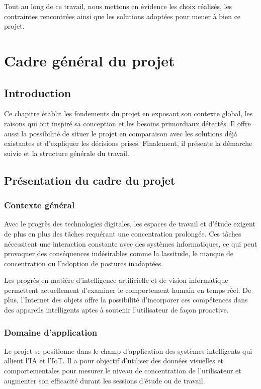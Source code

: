 \documentclass[12pt,a4paper]{report}
\begin{document}
Tout au long de ce travail, nous mettons en évidence les choix réalisés, les contraintes rencontrées ainsi que les solutions adoptées pour mener à bien ce projet.

\clearpage

\chapter{Cadre général du projet}

\section{Introduction}
Ce chapitre établit les fondements du projet en exposant son contexte global, les raisons qui ont inspiré sa conception et les besoins primordiaux détectés. Il offre aussi la possibilité de situer le projet en comparaison avec les solutions déjà existantes et d'expliquer les décisions prises. Finalement, il présente la démarche suivie et la structure générale du travail.

\section{Présentation du cadre du projet}

\subsection{Contexte général}
Avec le progrès des technologies digitales, les espaces de travail et d'étude exigent de plus en plus des tâches requérant une concentration prolongée. Ces tâches nécessitent une interaction constante avec des systèmes informatiques, ce qui peut provoquer des conséquences indésirables comme la lassitude, le manque de concentration ou l'adoption de postures inadaptées.

Les progrès en matière d'intelligence artificielle et de vision informatique permettent actuellement d'examiner le comportement humain en temps réel. De plus, l'Internet des objets offre la possibilité d'incorporer ces compétences dans des appareils intelligents aptes à soutenir l'utilisateur de façon proactive.

\subsection{Domaine d'application}
Le projet se positionne dans le champ d'application des systèmes intelligents qui allient l'\ac{IA} et l'\ac{IoT}. Il a pour objectif d'utiliser des données visuelles et comportementales pour mesurer le niveau de concentration de l'utilisateur et augmenter son efficacité durant les sessions d'étude ou de travail.
\end{document}
